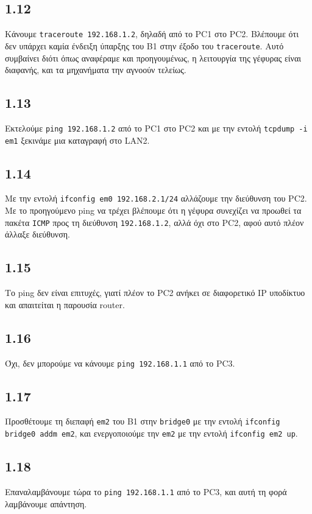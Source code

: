 \documentclass[a4paper, 12pt]{article}
\begin{document}
	\subsection*{1.12}
		Κάνουμε \verb|traceroute 192.168.1.2|, δηλαδή από το PC1 στο PC2. Βλέπουμε ότι δεν υπάρχει καμία ένδειξη ύπαρξης του B1 στην έξοδο του \verb|traceroute|. Αυτό συμβαίνει διότι όπως αναφέραμε και προηγουμένως, η λειτουργία της γέφυρας είναι διαφανής, και τα μηχανήματα την αγνοούν τελείως.
	
	\subsection*{1.13}
		Εκτελούμε \verb|ping 192.168.1.2| από το PC1 στο PC2 και με την εντολή \verb|tcpdump -i em1| ξεκινάμε μια καταγραφή στο LAN2.
	
	\subsection*{1.14}
		Με την εντολή \verb|ifconfig em0 192.168.2.1/24| αλλάζουμε την διεύθυνση του PC2. Με το προηγούμενο ping να τρέχει βλέπουμε ότι η γέφυρα συνεχίζει να προωθεί τα πακέτα \verb|ICMP| προς τη διεύθυνση \verb|192.168.1.2|, αλλά όχι στο PC2, αφού αυτό πλέον άλλαξε διεύθυνση.
	
	\subsection*{1.15}
		Το ping δεν είναι επιτυχές, γιατί πλέον το PC2 ανήκει σε διαφορετικό IP υποδίκτυο και απαιτείται η παρουσία router.
	
	\subsection*{1.16}
		Όχι, δεν μπορούμε να κάνουμε \verb|ping 192.168.1.1| από το PC3.
	
	\subsection*{1.17}
		Προσθέτουμε τη διεπαφή \verb|em2| του B1 στην \verb|bridge0| με την εντολή \verb|ifconfig bridge0 addm em2|, και ενεργοποιούμε την \verb|em2| με την εντολή \verb|ifconfig em2 up|.
	
	\subsection*{1.18}
		Επαναλαμβάνουμε τώρα το \verb|ping 192.168.1.1| από το PC3, και αυτή τη φορά λαμβάνουμε απάντηση.
	
\end{document}
